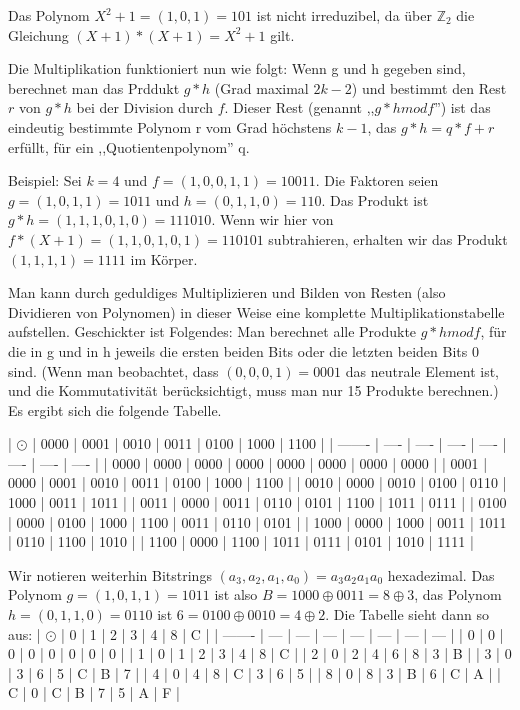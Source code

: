 \documentclass[a4paper]{article}
\begin{document}
\begin{multicols}{3}
    Das Polynom $X^2+1=(1,0,1)=101$ ist nicht irreduzibel, da über $\mathbb{Z}_2$ die Gleichung $(X+1)*(X+1)=X^2+1$ gilt.

    Die Multiplikation funktioniert nun wie folgt: Wenn g und h gegeben sind, berechnet man das Prddukt $g*h$ (Grad maximal $2k-2$) und bestimmt den Rest $r$ von $g*h$ bei der Division durch $f$. Dieser Rest (genannt ,,$g*h mod f$'') ist das eindeutig bestimmte Polynom r vom Grad höchstens $k-1$, das $g*h=q*f+r$ erfüllt, für ein ,,Quotientenpolynom'' q.

    Beispiel: Sei $k=4$ und $f=(1,0,0,1,1)=10011$. Die Faktoren seien $g=(1,0,1,1)=1011$ und $h=(0,1,1,0)=110$. Das Produkt ist $g*h=(1,1,1,0,1,0)=111010$. Wenn wir hier von $f*(X+1)=(1,1,0,1,0,1)=110101$ subtrahieren, erhalten wir das Produkt $(1,1,1,1)=1111$ im Körper.

    Man kann durch geduldiges Multiplizieren und Bilden von Resten (also Dividieren von Polynomen) in dieser Weise eine komplette Multiplikationstabelle aufstellen. Geschickter ist Folgendes: Man berechnet alle Produkte $g*h mod f$, für die in g und in h jeweils die ersten beiden Bits oder die letzten beiden Bits 0 sind. (Wenn man beobachtet, dass $(0,0,0,1)=0001$ das neutrale Element ist, und die Kommutativität berücksichtigt, muss man nur 15 Produkte berechnen.) Es ergibt sich die folgende Tabelle.

    | $\odot$ | 0000 | 0001 | 0010 | 0011 | 0100 | 1000 | 1100 |
    | ------- | ---- | ---- | ---- | ---- | ---- | ---- | ---- |
    | 0000    | 0000 | 0000 | 0000 | 0000 | 0000 | 0000 | 0000 |
    | 0001    | 0000 | 0001 | 0010 | 0011 | 0100 | 1000 | 1100 |
    | 0010    | 0000 | 0010 | 0100 | 0110 | 1000 | 0011 | 1011 |
    | 0011    | 0000 | 0011 | 0110 | 0101 | 1100 | 1011 | 0111 |
    | 0100    | 0000 | 0100 | 1000 | 1100 | 0011 | 0110 | 0101 |
    | 1000    | 0000 | 1000 | 0011 | 1011 | 0110 | 1100 | 1010 |
    | 1100    | 0000 | 1100 | 1011 | 0111 | 0101 | 1010 | 1111 |

    Wir notieren weiterhin Bitstrings $(a_3,a_2,a_1,a_0)=a_3a_2a_1a_0$ hexadezimal. Das Polynom $g=(1,0,1,1)=1011$ ist also $B=1000\oplus 0011=8\oplus 3$, das Polynom $h=(0,1,1,0)=0110$ ist $6=0100\oplus 0010=4\oplus 2$.
    Die Tabelle sieht dann so aus:
    | $\odot$ | 0   | 1   | 2   | 3   | 4   | 8   | C   |
    | ------- | --- | --- | --- | --- | --- | --- | --- |
    | 0       | 0   | 0   | 0   | 0   | 0   | 0   | 0   |
    | 1       | 0   | 1   | 2   | 3   | 4   | 8   | C   |
    | 2       | 0   | 2   | 4   | 6   | 8   | 3   | B   |
    | 3       | 0   | 3   | 6   | 5   | C   | B   | 7   |
    | 4       | 0   | 4   | 8   | C   | 3   | 6   | 5   |
    | 8       | 0   | 8   | 3   | B   | 6   | C   | A   |
    | C       | 0   | C   | B   | 7   | 5   | A   | F   |


\end{multicols}
\end{document}
